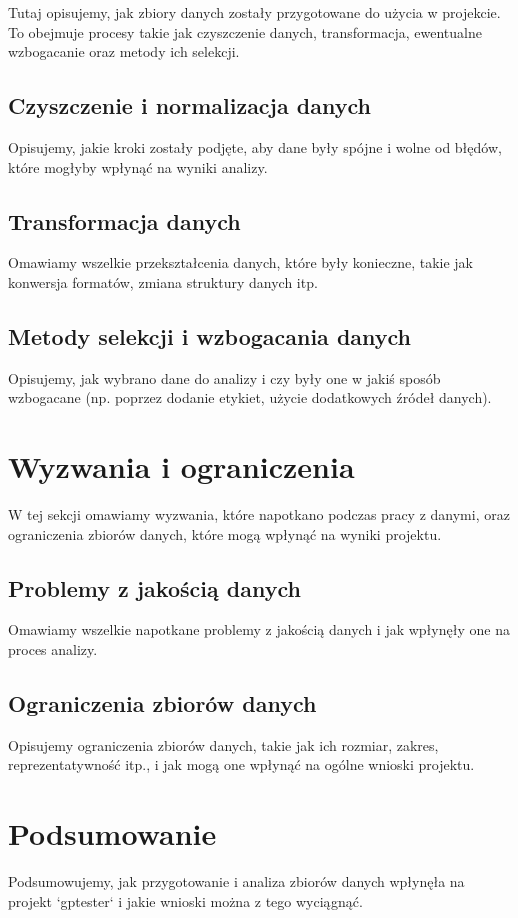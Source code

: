 Tutaj opisujemy, jak zbiory danych zostały przygotowane do użycia w projekcie. To obejmuje procesy takie jak czyszczenie danych, transformacja, ewentualne wzbogacanie oraz metody ich selekcji.

\subsection{Czyszczenie i normalizacja danych}
Opisujemy, jakie kroki zostały podjęte, aby dane były spójne i wolne od błędów, które mogłyby wpłynąć na wyniki analizy.

\subsection{Transformacja danych}
Omawiamy wszelkie przekształcenia danych, które były konieczne, takie jak konwersja formatów, zmiana struktury danych itp.

\subsection{Metody selekcji i wzbogacania danych}
Opisujemy, jak wybrano dane do analizy i czy były one w jakiś sposób wzbogacane (np. poprzez dodanie etykiet, użycie dodatkowych źródeł danych).

\section{Wyzwania i ograniczenia}
\label{sec:wyzwania_i_ograniczenia}

W tej sekcji omawiamy wyzwania, które napotkano podczas pracy z danymi, oraz ograniczenia zbiorów danych, które mogą wpłynąć na wyniki projektu.

\subsection{Problemy z jakością danych}
Omawiamy wszelkie napotkane problemy z jakością danych i jak wpłynęły one na proces analizy.

\subsection{Ograniczenia zbiorów danych}
Opisujemy ograniczenia zbiorów danych, takie jak ich rozmiar, zakres, reprezentatywność itp., i jak mogą one wpłynąć na ogólne wnioski projektu.

\section{Podsumowanie}
Podsumowujemy, jak przygotowanie i analiza zbiorów danych wpłynęła na projekt `gptester` i jakie wnioski można z tego wyciągnąć.


